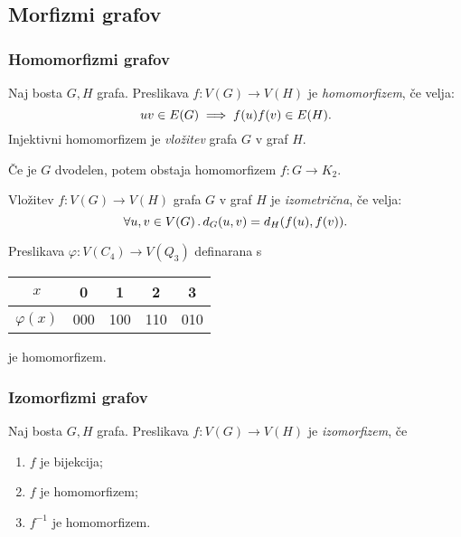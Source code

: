 \subsection{Morfizmi grafov}
\subsubsection*{Homomorfizmi grafov}
\begin{definicija}
    Naj bosta $G, H$ grafa. Preslikava $f: V(G) \to V(H)$ je \emph{homomorfizem}, če velja: $$uv \in E(G) \implies f(u)f(v) \in E(H).$$
    Injektivni homomorfizem je \emph{vložitev} grafa $G$ v graf $H$.
\end{definicija}

\begin{opomba}
    Če je $G$ dvodelen, potem obstaja homomorfizem $f: G \to K_2$.
\end{opomba}

\begin{definicija}
    Vložitev $f: V(G) \to V(H)$ grafa $G$ v graf $H$ je \emph{izometrična}, če velja:
    $$\forall u, v \in V(G) \,.\,d_G(u,v)=d_H(f(u), f(v)).$$
\end{definicija}

\begin{primer}
    Preslikava $\varphi: V(C_4) \to V(Q_3)$ definarana s 
    \begin{center}
        \begin{tabular}{ c | c c c c }
         $x$ & 0 & 1 & 2 & 3 \\ \hline
         $\varphi(x)$ & 000 & 100 & 110 & 010  
        \end{tabular}
    \end{center}
    je homomorfizem.
\end{primer}

\subsubsection*{Izomorfizmi grafov}
\begin{definicija}
    Naj bosta $G, H$ grafa. Preslikava $f: V(G) \to V(H)$ je \emph{izomorfizem}, če
    \begin{enumerate}
        \item $f$ je bijekcija;
        \item $f$ je homomorfizem;
        \item $f^{-1}$ je homomorfizem.
    \end{enumerate}
\end{definicija}

